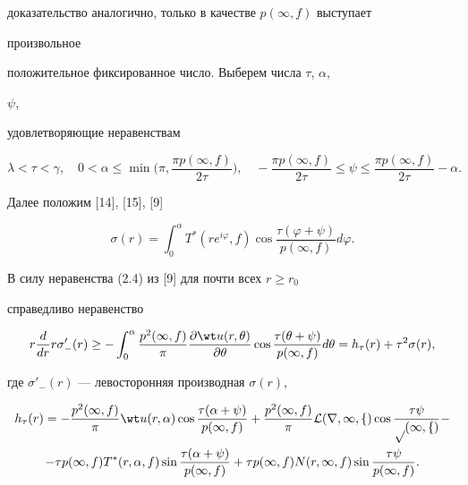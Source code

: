 доказательство аналогично, только в качестве $p(\infty,f)$ выступает 


произвольное 


положительное фиксированное число. Выберем числа $\tau$, $\alpha$, 


$\psi$, 


удовлетворяющие неравенствам 


$$ 


\lambda<\tau<\gamma,\quad 


0<\alpha\le\min\bigg(\pi,\frac{\pi p(\infty,f)}{2\tau} \bigg), 


\quad -\frac{\pi p(\infty,f)}{2\tau}\le\psi\le 


\frac{\pi p(\infty,f)}{2\tau}-\alpha. 


$$ 


 


Далее положим [14], [15], [9] 


$$ 


\sigma(r)=\int^\alpha_0 T^*(r e^{i\varphi},f) 


\cos\frac{\tau(\varphi+\psi)}{p(\infty,f)}d\varphi. 


$$ 


В силу неравенства (2.4) из [9] для почти всех $r\ge r_0$ 


справедливо неравенство 


\begin{equation} 


r\frac{d}{dr}r\sigma'_-(r)\ge-\int^\alpha_0 


\frac{p^2(\infty,f)}{\pi} 


\frac{\partial\wt u(r,\theta)}{\partial\theta} 


\cos\frac{\tau(\theta+\psi)}{p(\infty,f)}d\theta= 


h_\tau(r)+\tau^2\sigma(r), 


\end{equation} 


где $\sigma'_-(r)$ --- левосторонняя производная $\sigma(r)$, 


\begin{multline*} 


h_\tau(r)=-\frac{p^2(\infty,f)}{\pi} 


\wt u(r,\alpha)\cos\frac{\tau(\alpha+\psi)}{p(\infty,f)}+ 


\frac{p^2(\infty,f)}{\pi}\cal L(r,\infty,f) 


\cos\frac{\tau\psi}{p(\infty,f)} - \\ 


% 


-\tau p(\infty,f)T^*(r,\alpha,f)\sin 


\frac{\tau(\alpha+\psi)}{p(\infty,f)}+ 


\tau p(\infty,f)N(r,\infty,f)\sin\frac{\tau\psi}{p(\infty,f)}. 


\end{multline*} 



